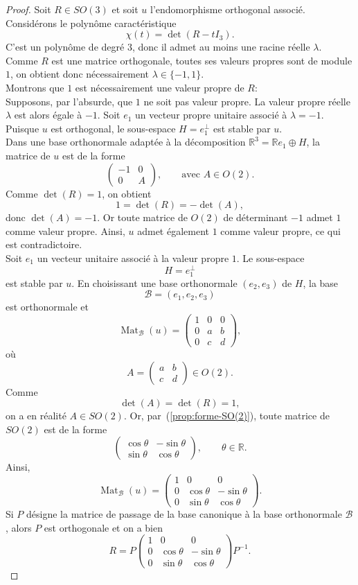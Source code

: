\documentclass[12pt]{report}
\begin{document}
\begin{proof}
Soit $R\in SO(3)$ et soit $u$ l'endomorphisme orthogonal associé.\\
Considérons le polynôme caractéristique
\[
\chi(t)=\det(R-tI_3).
\]
C'est un polynôme de degré $3$, donc il admet au moins une racine réelle $\lambda$. Comme $R$ est une matrice orthogonale, toutes ses valeurs propres sont de module $1$, on obtient donc nécessairement $\lambda\in\{-1,1\}$.\\
Montrons que $1$ est nécessairement une valeur propre de $R$:\\
Supposons, par l'absurde, que $1$ ne soit pas valeur propre. La valeur propre réelle $\lambda$ est alors égale à $-1$. Soit $e_1$ un vecteur propre unitaire associé à $\lambda=-1$. Puisque $u$ est orthogonal, le sous-espace $H=e_1^\perp$ est stable par $u$.\\
Dans une base orthonormale adaptée à la décomposition $\mathbb R^3=\mathbb Re_1\oplus H$, la matrice de $u$ est de la forme
\[
\begin{pmatrix}-1&0\\0&A\end{pmatrix},\qquad \text{avec }A\in O(2).
\]
Comme $\det(R)=1$, on obtient
\[
1=\det(R)=-\det(A),
\]
donc $\det(A)=-1$. Or toute matrice de $O(2)$ de déterminant $-1$ admet $1$ comme valeur propre. Ainsi, $u$ admet également $1$ comme valeur propre, ce qui est contradictoire.\\
Soit $e_1$ un vecteur unitaire associé à la valeur propre $1$. Le sous-espace
\[
H=e_1^\perp
\]
est stable par $u$. En choisissant une base orthonormale $(e_2,e_3)$ de $H$, la base
\[
\mathcal B=(e_1,e_2,e_3)
\]
est orthonormale et
\[
\operatorname{Mat}_{\mathcal B}(u)=\begin{pmatrix}1 &0 &0\\ 0 &a &b\\ 0 &c &d\end{pmatrix},
\]
où
\[
A=\begin{pmatrix}a&b\\c&d\end{pmatrix}\in O(2).
\]
Comme
\[
\det(A)=\det(R)=1,
\]
on a en réalité $A\in SO(2)$. Or, par~(\ref{prop:forme-SO(2)}), toute matrice de $SO(2)$ est de la forme
\[
\begin{pmatrix}\cos\theta &-\sin\theta\\ \sin\theta &\cos\theta\end{pmatrix},\qquad \theta\in\mathbb R.
\]
Ainsi,
\[
\operatorname{Mat}_{\mathcal B}(u)=\begin{pmatrix}1 &0 &0\\ 0 &\cos\theta &-\sin\theta\\ 0 &\sin\theta &\cos\theta\end{pmatrix}.
\]
Si $P$ désigne la matrice de passage de la base canonique à la base orthonormale $\mathcal B$, alors $P$ est orthogonale et on a bien
\[
R=P\begin{pmatrix}1 &0 &0\\ 0 &\cos\theta &-\sin\theta\\ 0 &\sin\theta &\cos\theta\end{pmatrix}P^{-1}.
\]
\end{proof}
\end{document}
